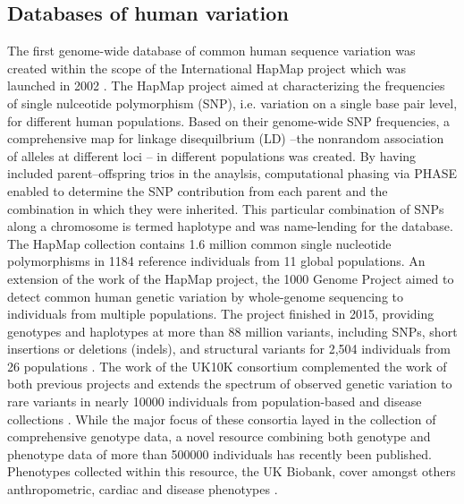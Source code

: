 \subsection{Databases of human variation}
\label{subsection:databases}
The first genome-wide database of common human sequence variation was created within the scope of the International HapMap project which was launched in 2002 \citep{HapMap2005,HapMap2007,HapMap2010}.
The HapMap project aimed at characterizing the frequencies of single nulceotide polymorphism (SNP), i.e. variation on a single base pair level, for different human populations. Based on their genome-wide SNP frequencies, a comprehensive map for linkage disequilbrium (LD) --the nonrandom association of alleles at different loci \citep{Lewontin1960}-- in different populations was created. By having included parent–offspring trios in the anaylsis, computational phasing via PHASE \citep{Stephens2001} enabled to determine the SNP contribution from each parent and the combination in which they were inherited. This particular combination of SNPs along a chromosome is termed haplotype and was name-lending for the database. The HapMap collection contains 1.6 million common single nucleotide polymorphisms in \num{1184} reference individuals from 11 global populations. An extension of the work of the HapMap project, the 1000 Genome Project aimed to detect common human genetic variation by whole-genome sequencing to individuals from multiple populations. The project finished in 2015, providing genotypes and haplotypes at more than 88 million variants, including SNPs, short insertions or deletions (indels), and structural variants for 2,504 individuals from 26 populations \citep{1000Genomes2011,1000Genomes2012,1000Genomes2015}. The work of the UK10K consortium complemented the work of both previous projects and extends the spectrum of observed genetic variation to rare variants in nearly \num{10000} individuals from population-based and disease collections \citep{UK10KConsortium2015}. While the major focus of these consortia layed in the collection of comprehensive genotype data, a novel resource combining both genotype and phenotype data of more than \num{500000} individuals has recently been published. Phenotypes collected within this resource, the UK Biobank, cover amongst others anthropometric, cardiac and disease phenotypes \citep{Sudlow2015}.

